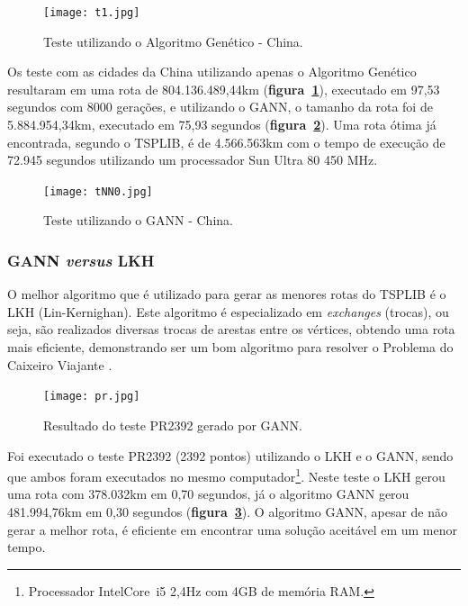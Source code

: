 \documentclass[12pt,openright,a4paper,oneside]{tcc}
\begin{document}
   		\begin{figure}[h]
			\centering
            \caption{Teste utilizando o Algoritmo Genético - China.}
	        \texttt{[image: t1.jpg]}
	        \label{figt1}
   		\end{figure}

        Os teste com as cidades da China utilizando apenas o Algoritmo Genético resultaram em uma rota de 804.136.489,44km (\textbf{figura~\ref{figt1}}), executado em 97,53 segundos com 8000 gerações, e utilizando o GANN, o tamanho da rota foi de 5.884.954,34km, executado em 75,93 segundos (\textbf{figura~\ref{figtNN0}}). Uma rota ótima já encontrada, segundo o TSPLIB, é de 4.566.563km com o tempo de execução de 72.945 segundos utilizando um processador Sun Ultra 80 450 MHz.
        \begin{figure}[h]
            \centering
            \caption{Teste utilizando o GANN - China.}
            \texttt{[image: tNN0.jpg]}
            \label{figtNN0}
        \end{figure}

        
   		\subsubsection{GANN \textit{versus} LKH}

		O melhor algoritmo que é utilizado para gerar as menores rotas do TSPLIB é o LKH (Lin-Kernighan). Este algoritmo é especializado em \textit{exchanges} (trocas), ou seja, são realizados diversas trocas de arestas entre os vértices, obtendo uma rota mais eficiente, demonstrando ser um bom algoritmo para resolver o Problema do Caixeiro Viajante \cite{LKH}. 

		\begin{figure}[h]
			\centering
            \caption{Resultado do teste PR2392 gerado por GANN.}
		    \texttt{[image: pr.jpg]}
		    \label{figpa}
		\end{figure}

		Foi executado o teste PR2392 (2392 pontos) utilizando o LKH e o GANN, sendo que ambos foram executados no mesmo computador\footnote{Processador Intel\textregistered Core\texttrademark ~i5 2,4Hz com 4GB de memória RAM.}. Neste teste o LKH gerou uma rota com 378.032km em 0,70 segundos, já o algoritmo GANN gerou 481.994,76km em 0,30 segundos (\textbf{figura~\ref{figpa}}).
		O algoritmo GANN, apesar de não gerar a melhor rota, é eficiente em encontrar uma solução aceitável em um menor tempo.
\end{document}
